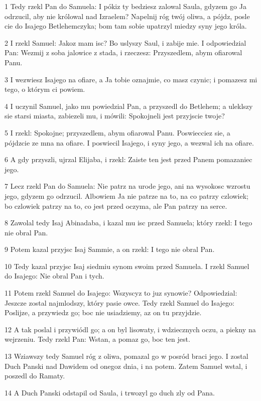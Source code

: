 \par 1 Tedy rzekl Pan do Samuela: I pókiz ty bedziesz zalowal Saula, gdyzem go Ja odrzucil, aby nie królowal nad Izraelem? Napelnij róg twój oliwa, a pójdz, posle cie do Isajego Betlehemczyka; bom tam sobie upatrzyl miedzy syny jego króla.
\par 2 I rzekl Samuel: Jakoz mam isc? Bo uslyszy Saul, i zabije mie. I odpowiedzial Pan: Wezmij z soba jalowice z stada, i rzeczesz: Przyszedlem, abym ofiarowal Panu.
\par 3 I wezwiesz Isajego na ofiare, a Ja tobie oznajmie, co masz czynic; i pomazesz mi tego, o którym ci powiem.
\par 4 I uczynil Samuel, jako mu powiedzial Pan, a przyszedl do Betlehem; a uleklszy sie starsi miasta, zabiezeli mu, i mówili: Spokojneli jest przyjscie twoje?
\par 5 I rzekl: Spokojne; przyszedlem, abym ofiarowal Panu. Poswiecciez sie, a pójdzcie ze mna na ofiare. I poswiecil Isajego, i syny jego, a wezwal ich na ofiare.
\par 6 A gdy przyszli, ujrzal Elijaba, i rzekl: Zaiste ten jest przed Panem pomazaniec jego.
\par 7 Lecz rzekl Pan do Samuela: Nie patrz na urode jego, ani na wysokosc wzrostu jego, gdyzem go odrzucil. Albowiem Ja nie patrze na to, na co patrzy czlowiek; bo czlowiek patrzy na to, co jest przed oczyma, ale Pan patrzy na serce.
\par 8 Zawolal tedy Isaj Abinadaba, i kazal mu isc przed Samuela; który rzekl: I tego nie obral Pan.
\par 9 Potem kazal przyjsc Isaj Sammie, a on rzekl: I tego nie obral Pan.
\par 10 Tedy kazal przyjsc Isaj siedmiu synom swoim przed Samuela. I rzekl Samuel do Isajego: Nie obral Pan i tych.
\par 11 Potem rzekl Samuel do Isajego: Wszyscyz to juz synowie? Odpowiedzial: Jeszcze zostal najmlodszy, który pasie owce. Tedy rzekl Samuel do Isajego: Poslijze, a przywiedz go; boc nie usiadziemy, az on tu przyjdzie.
\par 12 A tak poslal i przywiódl go; a on byl lisowaty, i wdziecznych oczu, a piekny na wejrzeniu. Tedy rzekl Pan: Wstan, a pomaz go, boc ten jest.
\par 13 Wziawszy tedy Samuel róg z oliwa, pomazal go w posród braci jego. I zostal Duch Panski nad Dawidem od onegoz dnia, i na potem. Zatem Samuel wstal, i poszedl do Ramaty.
\par 14 A Duch Panski odstapil od Saula, i trwozyl go duch zly od Pana.
